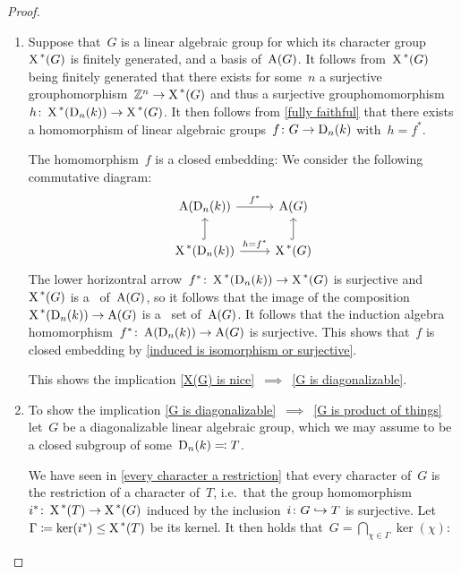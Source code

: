 \begin{proof}
\begin{enumerate}[label = Step~\arabic*]
    \item
      Suppose that~$G$ is a linear algebraic group for which its character group~$\operatorname{X}^{\,*}(G)$ is finitely generated, and a basis of~$\operatorname{A}(G)$.
      It follows from~$\operatorname{X}^{\,*}(G)$ being finitely generated that there exists for some~$n$ a surjective grouphomorphism~$\mathbb{Z}^n \to \operatorname{X}^{\,*}(G)$ and thus a surjective grouphomomorphism~$h \colon \operatorname{X}^{\,*}(\operatorname{D}_n(k)) \to \operatorname{X}^{\,*}(G)$.
      It then follows from \ref{fully faithful} that there exists a homomorphism of linear algebraic groups~$f \colon G \to \operatorname{D}_n(k)$ with~$h = f^*$.
      
      The homomorphism~$f$ is a closed embedding:
      We consider the following commutative diagram:
      \[
        \begin{tikzcd}
            \coord(\Diag_n(k))
            \arrow{r}[above]{f^*}
          & \coord(G)
          \\
            \chargroup(\Diag_n(k))
            \arrow{r}[above]{h = f^*}
            \arrow[hook]{u}
          & \chargroup(G)
            \arrow[hook]{u}
        \end{tikzcd}
      \]
      The lower horizontral arrow~$f^* \colon \operatorname{X}^{\,*}(\operatorname{D}_n(k)) \to \operatorname{X}^{\,*}(G)$ is surjective and~$\operatorname{X}^{\,*}(G)$ is a~ of~$\operatorname{A}(G)$, so it follows that the image of the composition~$\operatorname{X}^{\,*}(\operatorname{D}_n(k)) \to \operatorname{A}(G)$ is a~ set of~$\operatorname{A}(G)$.
      It follows that the induction algebra homomorphism~$f^* \colon \operatorname{A}(\operatorname{D}_n(k)) \to \operatorname{A}(G)$ is surjective.
      This shows that~$f$ is closed embedding by \cref{induced is isomorphism or surjective}.
      
      This shows the implication \ref*{X(G) is nice}~$\implies$~\ref*{G is diagonalizable}.
      
    \item
      To show the implication \ref*{G is diagonalizable}~$\implies$~\ref*{G is product of things} let~$G$ be a diagonalizable linear algebraic group, which we may assume to be a closed subgroup of some~$\operatorname{D}_n(k) \eqqcolon T$.
      
      We have seen in \ref{every character a restriction} that every character of~$G$ is the restriction of a character of~$T$, i.e.\ that the group homomorphism~$i^* \colon \operatorname{X}^{\,*}(T) \to \operatorname{X}^{\,*}(G)$ induced by the inclusion~$i \colon G \hookrightarrow T$ is surjective.
      Let~$\Gamma \coloneqq \ker(i^*) \leq \operatorname{X}^{\,*}(T)$ be its kernel.
      It then holds that~$G = \bigcap_{\chi \in \Gamma} \ker(\chi)$:
      

\end{enumerate}
\end{proof}
